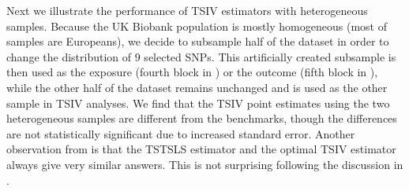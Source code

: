 \documentclass[preprint]{imsart}
\begin{document}
Next we illustrate the performance of TSIV estimators with
heterogeneous samples. Because the UK Biobank population is mostly
homogeneous (most of samples are Europeans), we decide to subsample half
of the dataset in order to change the distribution of $9$ selected
SNPs. This artificially created subsample is then used as the exposure
(fourth block in ) or the outcome (fifth block in
), while the other half of the dataset remains
unchanged and is used as the other sample in TSIV analyses. We find
that the TSIV point estimates using the two heterogeneous samples are
different from the benchmarks, though the differences are not
statistically significant due to increased standard error. Another
observation from  is that the TSTSLS estimator and the
optimal TSIV estimator always give very similar answers. This is not
surprising following the discussion in .
\end{document}
